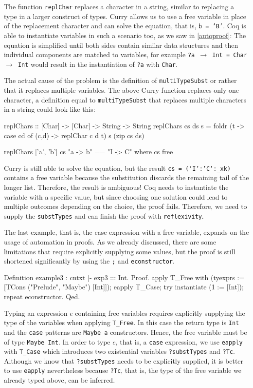 \documentclass[paper = a4, fleqn, abstract=on, twoside]{scrreprt}
\begin{document}
The function \texttt{replChar} replaces a character in a string, similar to replacing a type in a larger construct of types. Curry allows us to use a free variable in place of the replacement character and can solve the equation, that is, \texttt{{b = 'B'}}. Coq is able to instantiate variables in such a scenario too, as we saw in \autoref{autoproof}: The equation is simplified until both sides contain similar data structures and then individual components are matched to variables, for example \texttt{?a $\rightarrow$ Int = Char $\rightarrow$ Int} would result in the instantiation of \texttt{?a} with \texttt{Char}.
\par
The actual cause of the problem is the definition of \texttt{multiTypeSubst} or rather that it replaces multiple variables. The above Curry function replaces only one character, a definition equal to \texttt{multiTypeSubst} that replaces multiple characters in a string could look like this:
\begin{haskellcode}
replChars :: [Char] -> [Char] -> String -> String
replChars cs ds s =  foldr (\cd t -> case cd of (c,d) -> replChar c d t)
                           s (zip cs ds)
                    
replChars ['a', 'b'] cs "a -> b" == "I -> C" where cs free
\end{haskellcode}
Curry is still able to solve the equation, but the result \texttt{{cs = ('I':'C':\_xk)}} contains a free variable because the substitution discards the remaining tail of the longer list. Therefore, the result is ambiguous! Coq needs to instantiate the variable with a specific value, but since choosing one solution could lead to multiple outcomes depending on the choice, the proof fails. Therefore, we need to supply the \texttt{substTypes} and can finish the proof with \texttt{reflexivity}.\\
\par
The last example, that is, the case expression with a free variable, expands on the usage of automation in proofs. As we already discussed, there are some limitations that require explicitly supplying some values, but the proof is still shortened significantly by using the \texttt{;} and \texttt{econstructor}.
\begin{coqcode}
Definition example3 : cntxt |- exp3 ::: Int.
  Proof.
  apply T_Free with (tyexprs := [TCons ("Prelude", "Maybe") [Int]]);
  eapply T_Case;
  try instantiate (1 := [Int]);
  repeat econstructor.
Qed.
\end{coqcode}
Typing an expression $e$ containing free variables requires explicitly supplying the type of the variables when applying \texttt{T\_Free}. In this case the return type is \texttt{Int} and the \texttt{case} patterns are \texttt{Maybe a} constructors. Hence, the free variable must be of type \texttt{Maybe Int}. In order to type $e$, that is, a \texttt{case} expression, we use \texttt{eapply} with \texttt{T\_Case} which introduces two existential variables \texttt{?substTypes} and \texttt{?Tc}. Although we know that \texttt{?substTypes} needs to be explicitly supplied, it is better to use \texttt{eapply} nevertheless because \texttt{?Tc}, that is, the type of the free variable we already typed above, can be inferred.
\end{document}
